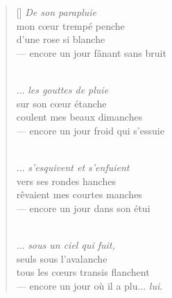 \documentclass[11pt,a4paper]{article}
\begin{document}
\thispagestyle{empty}



\bigskip

\begin{verse}[\versewidth]
\emph{De son parapluie} \\
\vin mon cœur trempé penche \\
\vin d'une rose si blanche \\
--- encore un jour fânant sans bruit \\ \

... \emph{les gouttes de pluie} \\
\vin  sur son c{\oe}ur étanche \\
\vin  coulent mes beaux dimanches \\
--- encore un jour froid qui s'essuie \\ \

... \emph{s'esquivent et s'enfuient} \\
\vin  vers ses rondes hanches \\
\vin  rêvaient mes courtes manches \\
--- encore un jour dans son étui \\ \

... \emph{sous un ciel qui fuit,} \\
\vin  seuls sous l'avalanche \\
\vin  tous les c{\oe}urs transis flanchent \\
--- encore un jour où il a plu... \emph{lui}.
\end{verse}
\end{document}
